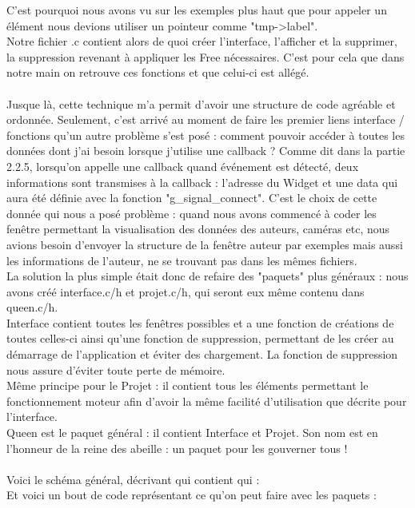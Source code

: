 \documentclass[11pt,french,a4paper]{report}
\begin{document}
C'est pourquoi nous avons vu sur les exemples plus haut 
que pour appeler un élément nous devions utiliser un pointeur comme "tmp->label". \\
Notre fichier .c contient alors de quoi créer l'interface, l'afficher et la supprimer, la suppression revenant à appliquer les 
Free  nécessaires. C'est pour cela que dans notre main on retrouve ces fonctions et que celui-ci est allégé. \\
\\
Jusque là, cette technique m'a permit d'avoir une structure de code agréable et ordonnée. Seulement, c'est arrivé au moment de 
faire les premier liens interface / fonctions qu'un autre problème s'est posé : comment pouvoir accéder à toutes les données
dont j'ai besoin lorsque j'utilise une callback ? Comme dit dans la partie 2.2.5, lorsqu'on appelle une callback quand 
événement est détecté, deux informations sont transmises à la callback : l'adresse du Widget et une data qui aura été définie
avec la fonction "g\_signal\_connect". C'est le choix de cette donnée qui nous a posé problème : quand nous avons commencé
à coder les fenêtre permettant la visualisation des données des auteurs, caméras etc, nous avions besoin d'envoyer la structure
de la fenêtre auteur par exemples mais aussi les informations de l'auteur, ne se trouvant pas dans les mêmes fichiers.  \\
La solution la plus simple était donc de refaire des "paquets" plus généraux : nous avons créé interface.c/h et projet.c/h, qui seront eux
même contenu dans queen.c/h. \\
Interface contient toutes les fenêtres possibles et a une fonction de créations de toutes celles-ci ainsi qu'une fonction de suppression, 
permettant de les créer au démarrage de l'application et éviter des chargement. La fonction de suppression nous assure d'éviter toute perte de mémoire.\\
Même principe pour le Projet : il contient tous les éléments permettant le fonctionnement moteur afin d'avoir la même facilité
d'utilisation que décrite pour l'interface. \\
Queen est le paquet général : il contient Interface et Projet. Son nom est en l'honneur de la reine des abeille : un paquet pour les gouverner tous ! \\
\\
Voici le schéma général, décrivant qui contient qui :%
\\
Et voici un bout de code représentant ce qu'on peut faire avec les paquets : 
\end{document}

